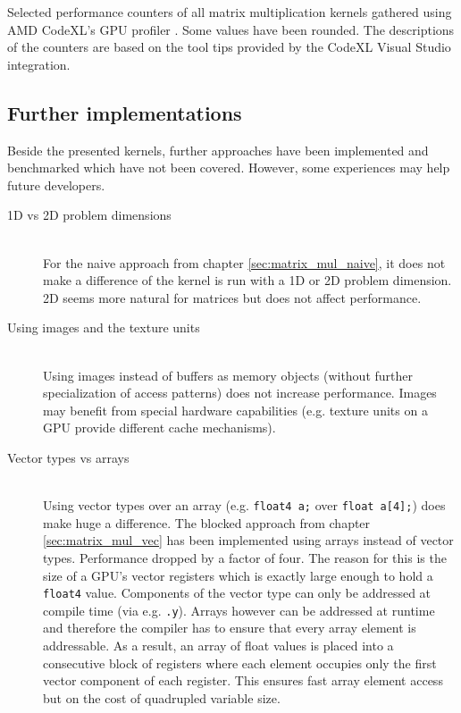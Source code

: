 \begin{table}
	\caption{Selected performance counters of all matrix multiplication kernels gathered using AMD CodeXL's GPU profiler \cite{amd_codexl}. Some values have been rounded. The descriptions of the counters are based on the tool tips provided by the CodeXL Visual Studio integration.}
	\label{tbl:matrix_perf_counter}
\end{table}

\subsection{Further implementations}
Beside the presented kernels, further approaches have been implemented and benchmarked which have not been covered. However, some experiences may help future developers.

\begin{description}
	\item[1D vs 2D problem dimensions] \hfill \\
	For the naive approach from chapter \ref{sec:matrix_mul_naive}, it does not make a difference of the kernel is run with a 1D or 2D problem dimension. 2D seems more natural for matrices but does not affect performance.
	\item[Using images and the texture units] \hfill \\
	Using images instead of buffers as memory objects (without further specialization of access patterns) does not increase performance. Images may benefit from special hardware capabilities (e.g. texture units on a GPU provide different cache mechanisms).
	\item[Vector types vs arrays] \hfill \\
	Using vector types over an array (e.g. \lstinline!float4 a;! over \lstinline!float a[4];!) does make huge a difference. The blocked approach from chapter \ref{sec:matrix_mul_vec} has been implemented using arrays instead of vector types. Performance dropped by a factor of four. The reason for this is the size of a GPU's vector registers which is exactly large enough to hold a \lstinline!float4! value. Components of the vector type can only be addressed at compile time (via e.g. \lstinline!.y!). Arrays however can be addressed at runtime and therefore the compiler has to ensure that every array element is addressable. As a result, an array of float values is placed into a consecutive block of registers where each element occupies only the first vector component of each register. This ensures fast array element access but on the cost of quadrupled variable size.
\end{description}

